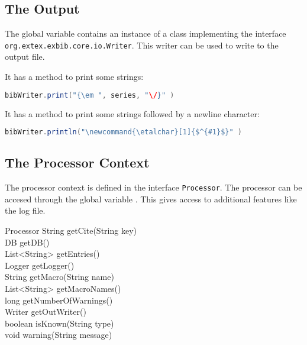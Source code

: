 \subsection{The Output}

The global variable  contains an instance of a class
implementing the interface \texttt{org.extex.exbib.core.io.Writer}.
This writer can be used to write to the output file.

It has a method  to print some strings:

\begin{lstlisting}[language=Java]
  bibWriter.print("{\em ", series, "\/}" )
\end{lstlisting}

It has a method  to print some strings followed by a
newline character:

\begin{lstlisting}[language=Java]
  bibWriter.println("\newcommand{\etalchar}[1]{$^{#1}$}" )
\end{lstlisting}


\subsection{The Processor Context}\label{sec:groovy.processor}

The processor context is defined in the interface \texttt{Processor}.
The processor can be accesed through the global variable
. This gives access to additional features like the
log file.

\begin{UMLclass}{Processor}
  String getCite(String key)\\
  DB getDB()\\
  List<String> getEntries()\\
  Logger getLogger()\\
  String getMacro(String name)\\
  List<String> getMacroNames()\\
  long getNumberOfWarnings()\\
  Writer getOutWriter()\\
  boolean isKnown(String type)\\
  void warning(String message)
\end{UMLclass}

